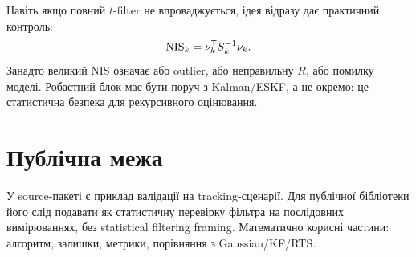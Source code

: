 Навіть якщо повний $t$-filter не впроваджується, ідея відразу дає практичний контроль:
\begin{equation}
  \mathrm{NIS}_k = \nu_k^{\mathsf{T}} S_k^{-1}\nu_k.
\end{equation}
Занадто великий NIS означає або outlier, або неправильну $R$, або помилку моделі. Робастний блок має бути поруч з Kalman/ESKF, а не окремо: це статистична безпека для рекурсивного оцінювання.

\section{Публічна межа}

У source-пакеті є приклад валідації на tracking-сценарії. Для публічної бібліотеки його слід подавати як статистичну перевірку фільтра на послідовних вимірюваннях, без statistical filtering framing. Математично корисні частини: алгоритм, залишки, метрики, порівняння з Gaussian/KF/RTS.

